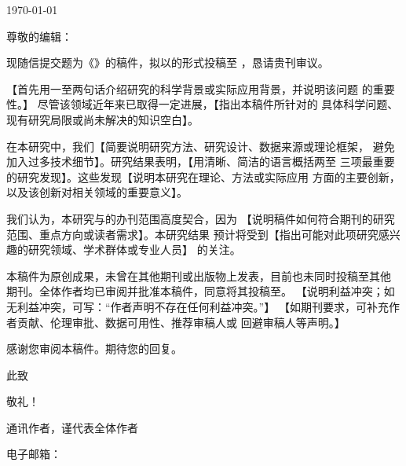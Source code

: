 \documentclass[11pt]{article}
\newcommand{\guidance}[1]{\textcolor{placeholder}{【#1】}}
\begin{document}
\hfill\today\par
\EditorName\par
\EditorTitle\par
\textit{\JournalName}

尊敬的编辑：

现随信提交题为《\ManuscriptTitle》的稿件，拟以\ArticleType 的形式投稿至
\textit{\JournalName}，恳请贵刊审议。

\guidance{首先用一至两句话介绍研究的科学背景或实际应用背景，并说明该问题
的重要性。} 尽管该领域近年来已取得一定进展，\guidance{指出本稿件所针对的
具体科学问题、现有研究局限或尚未解决的知识空白}。

在本研究中，我们\guidance{简要说明研究方法、研究设计、数据来源或理论框架，
避免加入过多技术细节}。研究结果表明，\guidance{用清晰、简洁的语言概括两至
三项最重要的研究发现}。这些发现\guidance{说明本研究在理论、方法或实际应用
方面的主要创新，以及该创新对相关领域的重要意义}。

我们认为，本研究与\textit{\JournalName}的办刊范围高度契合，因为
\guidance{说明稿件如何符合期刊的研究范围、重点方向或读者需求}。本研究结果
预计将受到\guidance{指出可能对此项研究感兴趣的研究领域、学术群体或专业人员}
的关注。

本稿件为原创成果，未曾在其他期刊或出版物上发表，目前也未同时投稿至其他
期刊。全体作者均已审阅并批准本稿件，同意将其投稿至\textit{\JournalName}。
\guidance{说明利益冲突；如无利益冲突，可写：“作者声明不存在任何利益冲突。”}
\guidance{如期刊要求，可补充作者贡献、伦理审批、数据可用性、推荐审稿人或
回避审稿人等声明。}

感谢您审阅本稿件。期待您的回复。

此致\par
敬礼！\par
\vspace{0.22in}

\begingroup
\setlength{\parskip}{2pt}
{\bfseries\CorrespondenceAuthorNameZh}\par
通讯作者，谨代表全体作者\par
\CorrespondenceAuthorAffiliationZh\par
\CorrespondenceAuthorAddress\par
电子邮箱：\href{mailto:\CorrespondenceAuthorEmail}{\CorrespondenceAuthorEmail}
\endgroup
\end{document}
